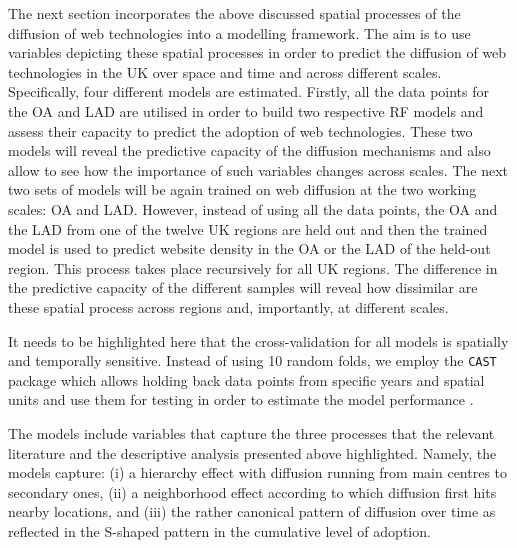 \documentclass[
  authoryear,
  preprint,
  3p]{elsarticle}
\begin{document}
The next section incorporates the above discussed spatial processes of
the diffusion of web technologies into a modelling framework. The aim is
to use variables depicting these spatial processes in order to predict
the diffusion of web technologies in the UK over space and time and
across different scales. Specifically, four different models are
estimated. Firstly, all the data points for the OA and LAD are utilised
in order to build two respective RF models and assess their capacity to
predict the adoption of web technologies. These two models will reveal
the predictive capacity of the diffusion mechanisms and also allow to
see how the importance of such variables changes across scales. The next
two sets of models will be again trained on web diffusion at the two
working scales: OA and LAD. However, instead of using all the data
points, the OA and the LAD from one of the twelve UK regions are held
out and then the trained model is used to predict website density in the
OA or the LAD of the held-out region. This process takes place
recursively for all UK regions. The difference in the predictive
capacity of the different samples will reveal how dissimilar are these
spatial process across regions and, importantly, at different scales.

It needs to be highlighted here that the cross-validation for all models
is spatially and temporally sensitive. Instead of using 10 random folds,
we employ the \texttt{CAST} package which allows holding back data
points from specific years and spatial units and use them for testing in
order to estimate the model performance \citep{meyer2018improving}.

The models include variables that capture the three processes that the
relevant literature and the descriptive analysis presented above
highlighted. Namely, the models capture: (i) a hierarchy effect with
diffusion running from main centres to secondary ones, (ii) a
neighborhood effect according to which diffusion first hits nearby
locations, and (iii) the rather canonical pattern of diffusion over time
as reflected in the S-shaped pattern in the cumulative level of
adoption.
\end{document}
